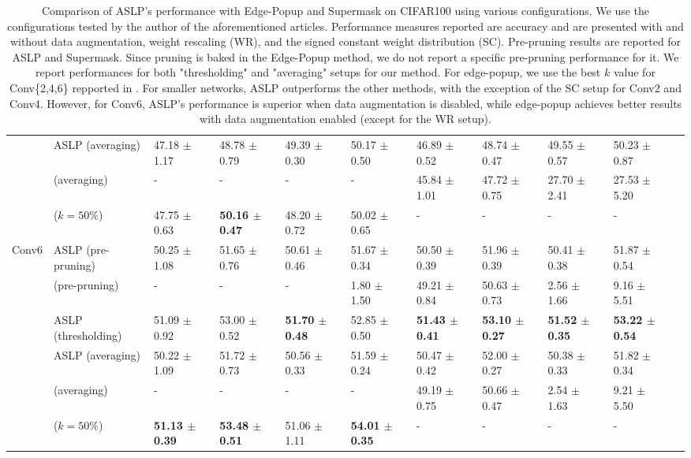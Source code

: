 \begin{table}
{\begin{tabular}{lllllllllll}
      & ASLP (averaging) & 47.18 $\pm$ 1.17 & 48.78 $\pm$ 0.79 & 49.39 $\pm$ 0.30 & 50.17 $\pm$ 0.50 & 46.89 $\pm$ 0.52 & 48.74 $\pm$ 0.47 & 49.55 $\pm$ 0.57 & 50.23 $\pm$ 0.87 \\
      & \cite{DBLP:conf/nips/ZhouLLY19} (averaging) & - & - & - & - & 45.84 $\pm$ 1.01 & 47.72 $\pm$ 0.75 & 27.70 $\pm$ 2.41 & 27.53 $\pm$ 5.20 \\
      & \cite{DBLP:conf/cvpr/RamanujanWKFR20} ($k=50\%$) & 47.75 $\pm$ 0.63 & \textbf{50.16 $\pm$ 0.47} & 48.20 $\pm$ 0.72 & 50.02 $\pm$ 0.65 & - & - & - & - \\
      \midrule
      \multirow{6}{*}{Conv6} & ASLP (pre-pruning) & 50.25 $\pm$ 1.08 & 51.65 $\pm$ 0.76 & 50.61 $\pm$ 0.46 & 51.67 $\pm$ 0.34 & 50.50 $\pm$ 0.39 & 51.96 $\pm$ 0.39 & 50.41 $\pm$ 0.38 & 51.87 $\pm$ 0.54 \\
      & \cite{DBLP:conf/nips/ZhouLLY19} (pre-pruning) & - & - & - & 1.80 $\pm$ 1.50 & 49.21 $\pm$ 0.84 & 50.63 $\pm$ 0.73 & 2.56 $\pm$ 1.66 & 9.16 $\pm$ 5.51 \\
      \cmidrule(lr){2-10}
      & ASLP (thresholding) & 51.09 $\pm$ 0.92 & 53.00 $\pm$ 0.52 & \textbf{51.70 $\pm$ 0.48} & 52.85 $\pm$ 0.50 & \textbf{51.43 $\pm$ 0.41} & \textbf{53.10 $\pm$ 0.27} & \textbf{51.52 $\pm$ 0.35} & \textbf{53.22 $\pm$ 0.54} \\
      & ASLP (averaging) & 50.22 $\pm$ 1.09 & 51.72 $\pm$ 0.73 & 50.56 $\pm$ 0.33 & 51.59 $\pm$ 0.24 & 50.47 $\pm$ 0.42 & 52.00 $\pm$ 0.27 & 50.38 $\pm$ 0.33 & 51.82 $\pm$ 0.34 \\
      & \cite{DBLP:conf/nips/ZhouLLY19} (averaging) & - & - & - & - & 49.19 $\pm$ 0.75 & 50.66 $\pm$ 0.47 & 2.54 $\pm$ 1.63 & 9.21 $\pm$ 5.50 \\
      & \cite{DBLP:conf/cvpr/RamanujanWKFR20} ($k=50\%$) & \textbf{51.13 $\pm$ 0.39} & \textbf{53.48 $\pm$ 0.51} & 51.06 $\pm$ 1.11 & \textbf{54.01 $\pm$ 0.35} & - & - & - & - \\
      \bottomrule
    \end{tabular}
  }
  \caption{Comparison of ASLP's performance with Edge-Popup and Supermask
  \cite{DBLP:conf/cvpr/RamanujanWKFR20,DBLP:conf/nips/ZhouLLY19} on CIFAR100
  using various configurations. We use the configurations tested by the author
  of the aforementioned articles. Performance measures reported are accuracy and
  are presented with and without data augmentation, weight rescaling (WR), and
  the signed constant weight distribution (SC). Pre-pruning results are reported
  for ASLP and Supermask. Since pruning is baked in the Edge-Popup method, we do
  not report a specific pre-pruning performance for it. We report performances for both
  "thresholding" and "averaging" setups for our method. For edge-popup, we use
  the best $k$ value for Conv\{2,4,6\} repported in
  \cite{DBLP:conf/cvpr/RamanujanWKFR20}. For smaller networks, ASLP outperforms
  the other methods, with the exception of the SC setup for Conv2 and Conv4.
  However, for Conv6, ASLP's performance is superior when data augmentation is
  disabled, while edge-popup achieves better results with data augmentation
  enabled (except for the WR setup).}
  \label{tab:chap2:con_performances_comparison_cifar100}
\end{table}
